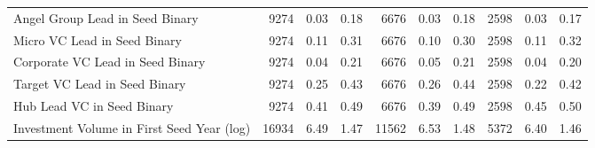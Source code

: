 {\begin{table}[!h]
{\begin{tabular}[t]{lrrrrrrrrr}
Angel Group Lead in Seed Binary & 9274 & 0.03 & 0.18 & 6676 & 0.03 & 0.18 & 2598 & 0.03 & 0.17\\
Micro VC Lead in Seed Binary & 9274 & 0.11 & 0.31 & 6676 & 0.10 & 0.30 & 2598 & 0.11 & 0.32\\
Corporate VC Lead in Seed Binary & 9274 & 0.04 & 0.21 & 6676 & 0.05 & 0.21 & 2598 & 0.04 & 0.20\\
Target VC Lead in Seed Binary & 9274 & 0.25 & 0.43 & 6676 & 0.26 & 0.44 & 2598 & 0.22 & 0.42\\
\addlinespace
Hub Lead VC in Seed Binary & 9274 & 0.41 & 0.49 & 6676 & 0.39 & 0.49 & 2598 & 0.45 & 0.50\\
Investment Volume in First Seed Year (log) & 16934 & 6.49 & 1.47 & 11562 & 6.53 & 1.48 & 5372 & 6.40 & 1.46\\
\bottomrule
\end{tabular}}
\end{table}
}
